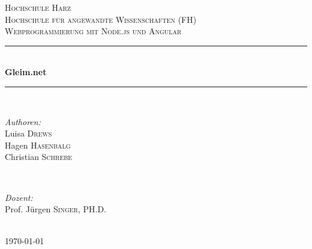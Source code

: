 \documentclass[12pt]{article} %
\begin{document}

\begin{titlepage}

\newcommand{\HRule}{\rule{\linewidth}{0.5mm}} %

\center %

\textsc{\LARGE Hochschule Harz\\Hochschule für angewandte Wissenschaften (FH)}\\[1.5cm] %
\textsc{\Large Webprogrammierung mit Node.js und Angular}\\[0.5cm] %

\HRule \\[0.4cm]
{ \huge \bfseries Gleim.net}\\[0.4cm] %
\HRule \\[1.5cm]

\begin{minipage}{0.4\textwidth}
\begin{flushleft} \large
\emph{Authoren:}\\
Luisa \textsc{Drews}\\Hagen \textsc{Hasenbalg}\\ Christian \textsc{Schrebe} %
\end{flushleft}
\end{minipage}
~
\begin{minipage}{0.4\textwidth}
\begin{flushright} \large
\emph{Dozent:} \\
Prof. Jürgen \textsc{Singer}, PH.D. %
\end{flushright}
\end{minipage}\\[4cm]

{\large \today}\\[3cm] %


\vfill %

\end{titlepage}
\end{document}
